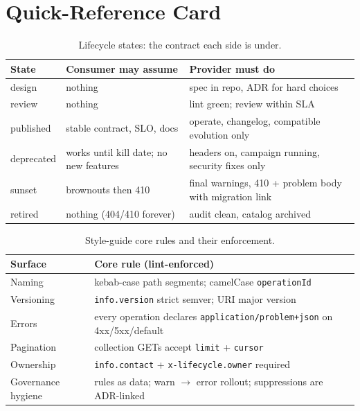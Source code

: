 \section{Quick-Reference Card}
\label{sec:ch20-quickref}

\begin{table}[htbp]
\centering\small
\begin{tabularx}{\textwidth}{l X X}
\toprule
\textbf{State} & \textbf{Consumer may assume} & \textbf{Provider must do} \\
\midrule
design & nothing & spec in repo, ADR for hard choices \\
review & nothing & lint green; review within SLA \\
published & stable contract, SLO, docs & operate, changelog, compatible evolution only \\
deprecated & works until kill date; no new features & headers on, campaign running, security fixes only \\
sunset & brownouts then 410 & final warnings, 410 + problem body with migration link \\
retired & nothing (404/410 forever) & audit clean, catalog archived \\
\bottomrule
\end{tabularx}
\caption{Lifecycle states: the contract each side is under.}
\label{tab:ch20-states-quick}
\end{table}

\begin{table}[htbp]
\centering\small
\begin{tabularx}{\textwidth}{l X}
\toprule
\textbf{Surface} & \textbf{Core rule (lint-enforced)} \\
\midrule
Naming & kebab-case path segments; camelCase \texttt{operationId} \\
Versioning & \texttt{info.version} strict semver; URI major version \\
Errors & every operation declares \texttt{application/problem+json} on 4xx/5xx/default \\
Pagination & collection GETs accept \texttt{limit} + \texttt{cursor} \\
Ownership & \texttt{info.contact} + \texttt{x-lifecycle.owner} required \\
Governance hygiene & rules as data; warn $\rightarrow$ error rollout; suppressions are ADR-linked \\
\bottomrule
\end{tabularx}
\caption{Style-guide core rules and their enforcement.}
\label{tab:ch20-rules-quick}
\end{table}

